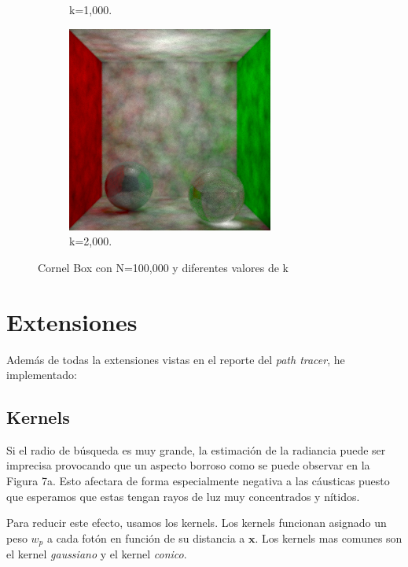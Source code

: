 \documentclass{article}
\begin{document}
\begin{figure}
\begin{subfigure}[h]{0.32\linewidth}
\caption{k=1,000.}
\end{subfigure}
\hfill
\begin{subfigure}[h]{0.32\linewidth}
\includegraphics[width=\linewidth]{imgs/100k2000k.png}
\caption{k=2,000.}
\end{subfigure}

\caption{Cornel Box con N=100,000 y diferentes valores de k}
\end{figure}

\section{Extensiones}
Además de todas la extensiones vistas en el reporte del \textit{path tracer}, he implementado:
\subsection{Kernels}

Si el radio de búsqueda es muy grande, la estimación de la radiancia puede ser imprecisa provocando que un aspecto borroso como se puede observar en la Figura 7a. Esto afectara de forma especialmente negativa a las cáusticas puesto que esperamos que estas tengan rayos de luz muy concentrados y nítidos.

Para reducir este efecto, usamos los kernels. Los kernels funcionan asignado un peso \(w_p\) a cada fotón en función de su distancia a \(\mathbf{x}\). Los kernels mas comunes son el kernel \textit{gaussiano} y el kernel \textit{conico}.
\end{document}
